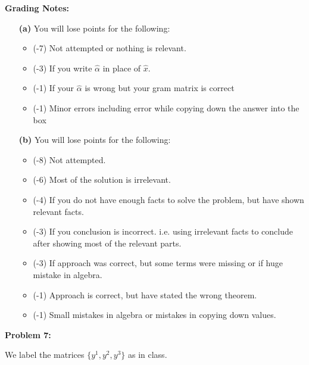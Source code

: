 \documentclass[letterpaper]{article}
\begin{document}
\noindent \textbf{Grading Notes:}
\begin{enumerate}
  \item[\bf (a)] You will lose points for the following:
    \begin{itemize}
      \item (-7) Not attempted or nothing is relevant.
      \item (-3) If you write $\hat\alpha$ in place of $\hat x$.
      \item (-1) If your $\hat\alpha$ is wrong but your gram matrix is correct
      \item (-1) Minor errors including error while copying down the answer into the box

    \end{itemize}
  \item[\bf (b)] You will lose points for the following:
    \begin{itemize}
	  \item (-8) Not attempted.
	  \item (-6) Most of the solution is irrelevant.	
      \item (-4) If you do not have enough facts to solve the problem, but have shown relevant facts.
      \item (-3) If you conclusion is incorrect. i.e. using irrelevant facts to conclude after showing most of the relevant parts.
      \item (-3) If approach was correct, but some terms were missing or if huge mistake in  algebra.
      \item (-1) Approach is correct, but have stated the wrong theorem.
      \item (-1) Small mistakes in algebra or mistakes in copying down values.
      \end{itemize}
\end{enumerate}
%


\newpage


\noindent \textbf{Problem 7:}

We label the matrices $\{ y^1, y^2, y^3\}$ as in class. %
\end{document}
